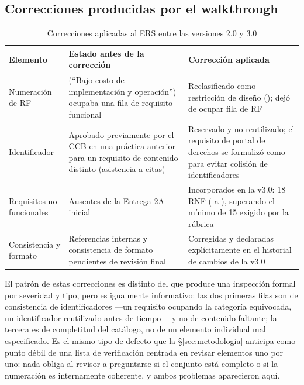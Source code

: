 \subsection{Correcciones producidas por el walkthrough}
 
\begin{table}[H]
\centering\footnotesize
\caption{Correcciones aplicadas al ERS entre las versiones 2.0 y 3.0}
\label{tab:correcciones}
\begin{tabular}{|C{2.2cm}|L{6.0cm}|L{6.4cm}|}
\hline
{}\textbf{Elemento} & \textbf{Estado antes de la corrección} & \textbf{Corrección aplicada}\\ \hline
Numeración de RF &  (``Bajo costo de implementación y operación'') ocupaba una fila de requisito funcional & Reclasificado como restricción de diseño (); dejó de ocupar fila de RF\\ \hline
Identificador  & Aprobado previamente por el CCB en una práctica anterior para un requisito de contenido distinto (asistencia a citas) & Reservado y no reutilizado; el requisito de portal de derechos se formalizó como  para evitar colisión de identificadores\\ \hline
Requisitos no funcionales & Ausentes de la Entrega 2A inicial & Incorporados en la v3.0: 18 RNF ( a ), superando el mínimo de 15 exigido por la rúbrica\\ \hline
Consistencia y formato & Referencias internas y consistencia de formato pendientes de revisión final & Corregidas y declaradas explícitamente en el historial de cambios de la v3.0\\ \hline
\end{tabular}
\end{table}
 
\noindent
El patrón de estas correcciones es distinto del que produce una inspección formal por severidad y
tipo, pero es igualmente informativo: las dos primeras filas son de consistencia de identificadores
---un requisito ocupando la categoría equivocada, un identificador reutilizado antes de tiempo--- y
no de contenido faltante; la tercera es de completitud del catálogo, no de un elemento individual mal
especificado. Es el mismo tipo de defecto que la \S\ref{sec:metodologia} anticipa como punto débil de
una lista de verificación centrada en revisar elementos uno por uno: nada obliga al revisor a
preguntarse si el conjunto está completo o si la numeración es internamente coherente, y ambos
problemas aparecieron aquí.
 
